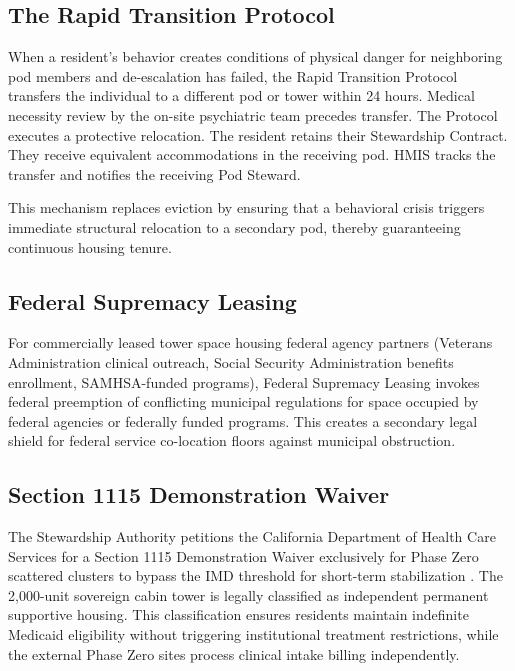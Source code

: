 \documentclass[12pt, letterpaper]{article}
\begin{document}

\subsection{The Rapid Transition Protocol}

When a resident's behavior creates conditions of physical danger for neighboring pod members and de-escalation has failed, the Rapid Transition Protocol transfers the individual to a different pod or tower within 24 hours. Medical necessity review by the on-site psychiatric team precedes transfer. The Protocol executes a protective relocation. The resident retains their Stewardship Contract. They receive equivalent accommodations in the receiving pod. HMIS tracks the transfer and notifies the receiving Pod Steward.

This mechanism replaces eviction by ensuring that a behavioral crisis triggers immediate structural relocation to a secondary pod, thereby guaranteeing continuous housing tenure.

\subsection{Federal Supremacy Leasing}

For commercially leased tower space housing federal agency partners (Veterans Administration clinical outreach, Social Security Administration benefits enrollment, SAMHSA-funded programs), Federal Supremacy Leasing invokes federal preemption of conflicting municipal regulations for space occupied by federal agencies or federally funded programs. This creates a secondary legal shield for federal service co-location floors against municipal obstruction.

\subsection{Section 1115 Demonstration Waiver}

The Stewardship Authority petitions the California Department of Health Care Services for a Section 1115 Demonstration Waiver exclusively for Phase Zero scattered clusters to bypass the IMD threshold for short-term stabilization \citep{calaim_1115_waiver_2023}. The 2,000-unit sovereign cabin tower is legally classified as independent permanent supportive housing. This classification ensures residents maintain indefinite Medicaid eligibility without triggering institutional treatment restrictions, while the external Phase Zero sites process clinical intake billing independently.
\end{document}
